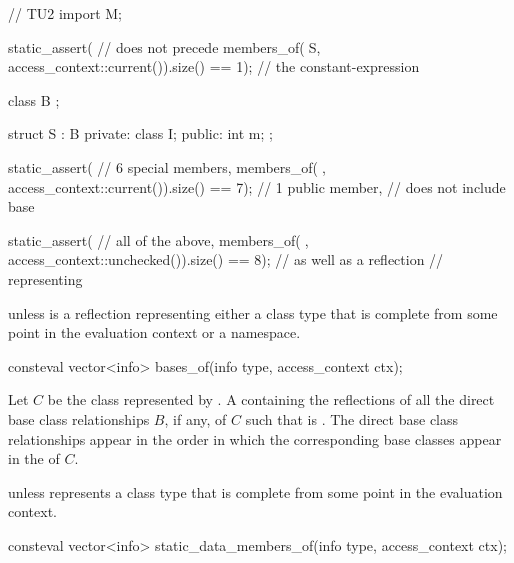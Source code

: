 \begin{itemdescr}
\begin{example}
\begin{codeblock}
// TU2
import M;

static_assert(                                                  //  does not precede
  members_of(^^NS, access_context::current()).size() == 1);     // the constant-expression

class B {};

struct S : B {
private:
  class I;
public:
  int m;
};

static_assert(                                                  // 6 special members,
  members_of(^^S, access_context::current()).size() == 7);      // 1 public member,
                                                                // does not include base

static_assert(                                                  // all of the above,
  members_of(^^S, access_context::unchecked()).size() == 8);    // as well as a reflection
                                                                // representing 
\end{codeblock}
\end{example}

\pnum
\throws
{} unless
 is a reflection representing either
a class type that is complete from some point in the evaluation context
or a namespace.
\end{itemdescr}

%
\begin{itemdecl}
consteval vector<info> bases_of(info type, access_context ctx);
\end{itemdecl}

\begin{itemdescr}
\pnum
\returns
Let $C$ be the class represented by .
A  containing the reflections
of all the direct base class relationships $B$, if any,
of $C$ such that  is .
The direct base class relationships appear in the order in which
the corresponding base classes appear in the  of $C$.

\pnum
\throws
{} unless
 represents a class type
that is complete from some point in the evaluation context.
\end{itemdescr}

%
\begin{itemdecl}
consteval vector<info> static_data_members_of(info type, access_context ctx);
\end{itemdecl}

